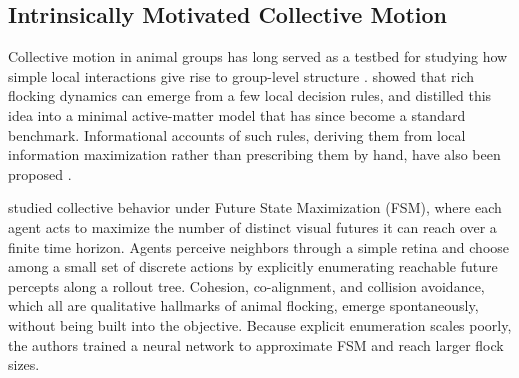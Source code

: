 \documentclass{article} %
\begin{document}

\subsection{Intrinsically Motivated Collective Motion}

Collective motion in animal groups has long served as a testbed for
studying how simple local interactions give rise to group-level
structure
\citep{couzin2009collective,cavagna2014bird,ouellette2022physics}.
\cite{reynolds_1987} showed that rich flocking dynamics can emerge
from a few local decision rules, and \cite{vicsek_1995} distilled
this idea into a minimal active-matter model that has since become a
standard benchmark. Informational accounts of such rules, deriving
them from local information maximization rather than prescribing them
by hand, have also been proposed
\citep{salge11:_local_infor_maxim_emerg_flock_behav}.

\cite{charlesworth_flocking} studied collective behavior under Future State Maximization (FSM), where each agent acts to maximize the number of distinct visual futures it can reach over a finite time horizon. Agents perceive neighbors through a simple retina and choose among a small set of discrete actions by explicitly enumerating reachable future percepts along a rollout tree. Cohesion, co-alignment, and collision avoidance, which all are qualitative hallmarks of animal flocking, emerge spontaneously, without being built into the objective. Because explicit enumeration scales poorly, the authors trained a neural network to approximate FSM and reach larger flock sizes.
\end{document}
